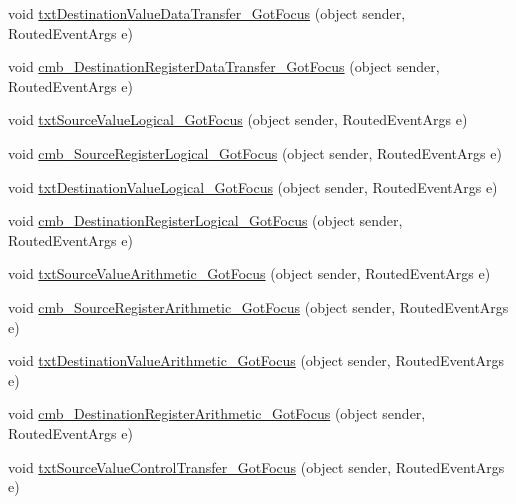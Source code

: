 \begin{DoxyCompactItemize}
\item 
void \hyperlink{class_c_p_u___o_s___simulator_1_1_instructions_window_a7d05b02bf62d6b920ebd1c2677e5a0dc}{txt\+Destination\+Value\+Data\+Transfer\+\_\+\+Got\+Focus} (object sender, Routed\+Event\+Args e)
\item 
void \hyperlink{class_c_p_u___o_s___simulator_1_1_instructions_window_a94becba2935eb5b5213fce4a90a639e2}{cmb\+\_\+\+Destination\+Register\+Data\+Transfer\+\_\+\+Got\+Focus} (object sender, Routed\+Event\+Args e)
\item 
void \hyperlink{class_c_p_u___o_s___simulator_1_1_instructions_window_a1126bf0eb7a7e562d7c197a7300842d2}{txt\+Source\+Value\+Logical\+\_\+\+Got\+Focus} (object sender, Routed\+Event\+Args e)
\item 
void \hyperlink{class_c_p_u___o_s___simulator_1_1_instructions_window_abe93d8b72aefc8adcf3b5bb26cc55a1b}{cmb\+\_\+\+Source\+Register\+Logical\+\_\+\+Got\+Focus} (object sender, Routed\+Event\+Args e)
\item 
void \hyperlink{class_c_p_u___o_s___simulator_1_1_instructions_window_ad56b9592b566db4c4e4756654891a045}{txt\+Destination\+Value\+Logical\+\_\+\+Got\+Focus} (object sender, Routed\+Event\+Args e)
\item 
void \hyperlink{class_c_p_u___o_s___simulator_1_1_instructions_window_a596ecf3b64608b39235b662565469b3e}{cmb\+\_\+\+Destination\+Register\+Logical\+\_\+\+Got\+Focus} (object sender, Routed\+Event\+Args e)
\item 
void \hyperlink{class_c_p_u___o_s___simulator_1_1_instructions_window_a82c5caec3787f079bb214dbd6a2a1505}{txt\+Source\+Value\+Arithmetic\+\_\+\+Got\+Focus} (object sender, Routed\+Event\+Args e)
\item 
void \hyperlink{class_c_p_u___o_s___simulator_1_1_instructions_window_aded465dc161799c6ae52c988e3f8882c}{cmb\+\_\+\+Source\+Register\+Arithmetic\+\_\+\+Got\+Focus} (object sender, Routed\+Event\+Args e)
\item 
void \hyperlink{class_c_p_u___o_s___simulator_1_1_instructions_window_ae969ae41ccdb44d87f180b18b11b5b29}{txt\+Destination\+Value\+Arithmetic\+\_\+\+Got\+Focus} (object sender, Routed\+Event\+Args e)
\item 
void \hyperlink{class_c_p_u___o_s___simulator_1_1_instructions_window_a9c964d2e398c2ed0699652c67c80422a}{cmb\+\_\+\+Destination\+Register\+Arithmetic\+\_\+\+Got\+Focus} (object sender, Routed\+Event\+Args e)
\item 
void \hyperlink{class_c_p_u___o_s___simulator_1_1_instructions_window_a0d1f28315429ad5e01867bef7dbf9b6b}{txt\+Source\+Value\+Control\+Transfer\+\_\+\+Got\+Focus} (object sender, Routed\+Event\+Args e)

\end{DoxyCompactItemize}
